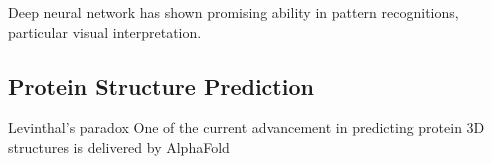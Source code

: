Deep neural network has shown promising ability in pattern recognitions, particular visual interpretation.
\par 

\subsection{Protein Structure Prediction}
Levinthal's paradox One of the current advancement in predicting protein 3D structures is delivered by AlphaFold